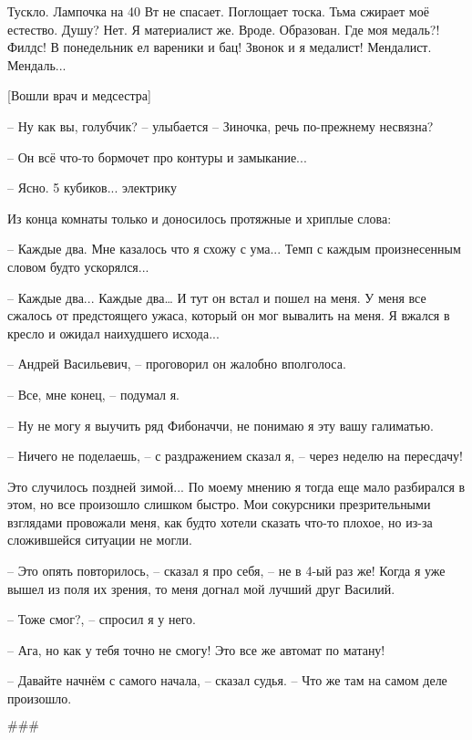 Тускло. Лампочка на 40 Вт не спасает. Поглощает тоска. Тьма сжирает моё естество. Душу? Нет. Я материалист же. Вроде. Образован. Где моя медаль?! Филдс! В понедельник ел вареники и бац! Звонок и я медалист! Мендалист. Мендаль...

[Вошли врач и медсестра]

-- Ну как вы, голубчик? -- улыбается -- Зиночка, речь по-прежнему несвязна?

-- Он всё что-то бормочет про контуры и замыкание...

-- Ясно. 5 кубиков... электрику

\asterisks

Из конца комнаты только и доносилось протяжные и хриплые слова:

-- Каждые два.
Мне казалось что я схожу с ума... Темп с каждым произнесенным словом будто ускорялся...

-- Каждые два... Каждые два…
И тут он встал и пошел на меня. У меня все сжалось от предстоящего ужаса, который он мог вывалить на меня. Я вжался в кресло и ожидал наихудшего исхода...

-- Андрей Васильевич, -- проговорил он жалобно вполголоса.

-- Все, мне конец, -- подумал я.

-- Ну не могу я выучить ряд Фибоначчи, не понимаю я эту вашу галиматью.

-- Ничего не поделаешь, -- с раздражением сказал я, -- через неделю на пересдачу!

\asterisks

Это случилось поздней зимой... По моему мнению я тогда еще мало разбирался в этом, но все произошло слишком быстро. Мои сокурсники презрительными взглядами провожали меня, как будто хотели сказать что-то плохое, но из-за сложившейся ситуации не могли.

-- Это опять повторилось, -- сказал я про себя, -- не в 4-ый раз же!
Когда я уже вышел из поля их зрения, то меня догнал мой лучший друг Василий.

-- Тоже смог?, -- спросил я у него.

-- Ага, но как у тебя точно не смогу! Это все же автомат по матану!

\asterisks

-- Давайте начнём с самого начала, -- сказал судья. -- Что же там на самом деле произошло.

\begin{center}\( \#\#\# \)\end{center}

